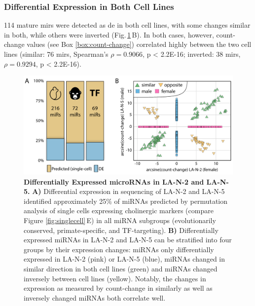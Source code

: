 \subsubsection{Differential Expression in Both Cell Lines}


114 mature \acp{mir} were detected as \ac{de} in both cell lines, with some changes similar in both, while others were inverted (Fig.\,\ref{fig:cc-cor-de-perm}\,B). In both cases, however, count-change values (see Box \ref{box:count-change}) correlated highly between the two cell lines (similar: 76 \acp{mir}, Spearman’s $\rho = 0.9066$, p < 2.2E-16; inverted: 38 \acp{mir}, $\rho = 0.9294$, p < 2.2E-16).

\begin{figure}[ht]
\centering
\includegraphics[width=\textwidth]{figures/cc-cor-de-perm}
\caption[Differentially Expressed microRNAs in LA-N-2 and LA-N-5.]{\textbf{Differentially Expressed microRNAs in LA-N-2 and LA-N-5.} \textbf{A)} Differential expression in sequencing of LA-N-2 and LA-N-5 identified approximately 25\% of miRNAs predicted by permutation analysis of single cells expressing cholinergic markers (compare Figure \ref{fig:singlecell}\,E) in all miRNA subgroups (evolutionarily conserved, primate-specific, and TF-targeting). \textbf{B)} Differentially expressed miRNAs in LA-N-2 and LA-N-5 can be stratified into four groups by their expression changes: miRNAs only differentially expressed in LA-N-2 (pink) or LA-N-5 (blue), miRNAs changed in similar direction in both cell lines (green) and miRNAs changed inversely between cell lines (yellow). Notably, the changes in expression as measured by count-change in similarly as well as inversely changed miRNAs both correlate well. 
\label{fig:cc-cor-de-perm}}
\end{figure}

